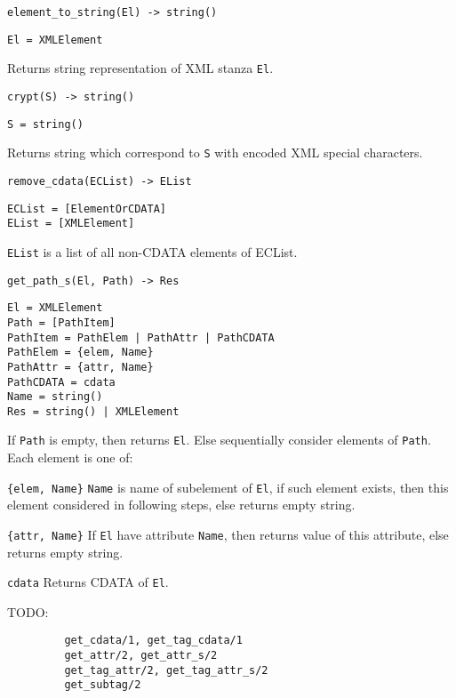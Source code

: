 \documentclass[a4paper,10pt]{article}
\begin{document}
\begin{description}
\item{\verb|element_to_string(El) -> string()|}
\begin{verbatim}
El = XMLElement
\end{verbatim}
  Returns string representation of XML stanza \texttt{El}.

\item{\verb|crypt(S) -> string()|}
\begin{verbatim}
S = string()
\end{verbatim}
  Returns string which correspond to \texttt{S} with encoded XML special
  characters.

\item{\verb|remove_cdata(ECList) -> EList|}
\begin{verbatim}
ECList = [ElementOrCDATA]
EList = [XMLElement]
\end{verbatim}
  \texttt{EList} is a list of all non-CDATA elements of ECList.



\item{\verb|get_path_s(El, Path) -> Res|}
\begin{verbatim}
El = XMLElement
Path = [PathItem]
PathItem = PathElem | PathAttr | PathCDATA
PathElem = {elem, Name}
PathAttr = {attr, Name}
PathCDATA = cdata
Name = string()
Res = string() | XMLElement
\end{verbatim}
  If \texttt{Path} is empty, then returns \texttt{El}.  Else sequentially
  consider elements of \texttt{Path}.  Each element is one of:
  \begin{description}
  \item{\verb|{elem, Name}|} \texttt{Name} is name of subelement of
    \texttt{El}, if such element exists, then this element considered in
    following steps, else returns empty string.
  \item{\verb|{attr, Name}|} If \texttt{El} have attribute \texttt{Name}, then
    returns value of this attribute, else returns empty string.
  \item{\verb|cdata|} Returns CDATA of \texttt{El}.
  \end{description}

\item{TODO:}
\begin{verbatim}
         get_cdata/1, get_tag_cdata/1
         get_attr/2, get_attr_s/2
         get_tag_attr/2, get_tag_attr_s/2
         get_subtag/2
\end{verbatim}
\end{description}
\end{document}
